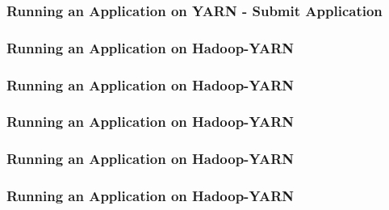 \begin{frame}[c]{ }
	\frametitle{Running an Application on YARN - Submit Application}
	\begin{figure}
		\centering
		
	\end{figure}
\end{frame}
%		
\begin{frame}[c]{ }
	\frametitle{Running an Application on Hadoop-YARN }
	\begin{figure}
		\centering
		
	\end{figure}
\end{frame}
\begin{frame}[c]{ }
	\frametitle{Running an Application on Hadoop-YARN }
	\begin{figure}
		\centering
		
	\end{figure}
\end{frame}
\begin{frame}[c]{ }
	\frametitle{Running an Application on Hadoop-YARN }
	\begin{figure}
		\centering
		
	\end{figure}
\end{frame}
\begin{frame}[c]{ }
	\frametitle{Running an Application on Hadoop-YARN }
	\begin{figure}
		\centering
		
	\end{figure}
\end{frame}
\begin{frame}[c]{ }
	\frametitle{Running an Application on Hadoop-YARN }
	\begin{figure}
		\centering
		
	\end{figure}
\end{frame}
